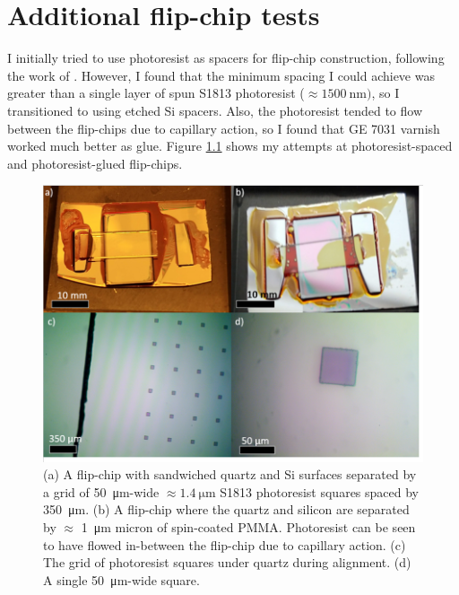 \documentclass[double,12pt,1in,seploa]{beavtex}
\begin{document}

\chapter{Additional flip-chip tests} \label{additional flip-chip tests}
I initially tried to use photoresist as spacers for flip-chip construction, following the work of \cite{bennaceur_mechanical_2015}. However, I found that the minimum spacing I could achieve was greater than a single layer of spun S1813 photoresist ($\approx \SI{1500}{\nano\meter})$, so I transitioned to using etched Si spacers. Also, the photoresist tended to flow between the flip-chips due to capillary action, so I found that GE 7031 varnish worked much better as glue. Figure \ref{PRFC} shows my attempts at photoresist-spaced and photoresist-glued flip-chips.


\begin{figure}
    \includegraphics[width = 1\textwidth]{photoresist flip-chips.png}
    \caption{(a) A flip-chip with sandwiched quartz and Si surfaces separated by a grid of \SI{50}{\micro\meter}-wide $\approx \SI{1.4}{\micro\meter}$ S1813 photoresist squares spaced by \SI{350}{\micro\meter}. (b) A flip-chip where the quartz and silicon are separated by $\approx$ \SI{1}{\micro\meter} micron of spin-coated PMMA. Photoresist can be seen to have flowed in-between the flip-chip due to capillary action. (c) The grid of photoresist squares under quartz during alignment. (d) A single \SI{50}{\micro\meter}-wide square.
    }
    \label{PRFC}
\end{figure}
\end{document}
